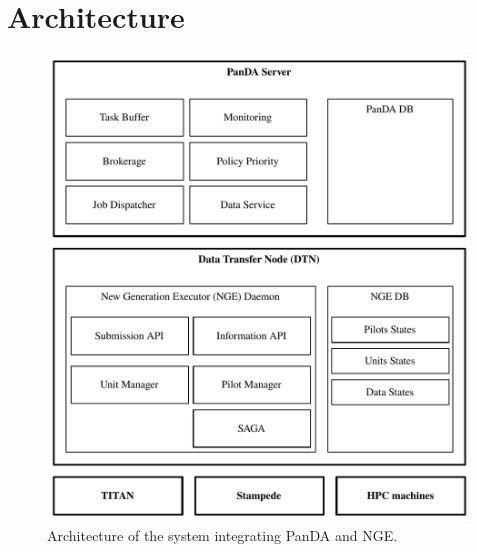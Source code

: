 \documentclass[10pt, conference, compsocconf]{IEEEtran}
\begin{document}
\section{Architecture}
\label{sec:panda_overview}

\begin{figure}
  \includegraphics[width=\columnwidth]{figures/panda_nge.pdf}
  \caption{Architecture of the system integrating PanDA and NGE.}
\label{fig:atlas_workflow}
\end{figure}
\end{document}
